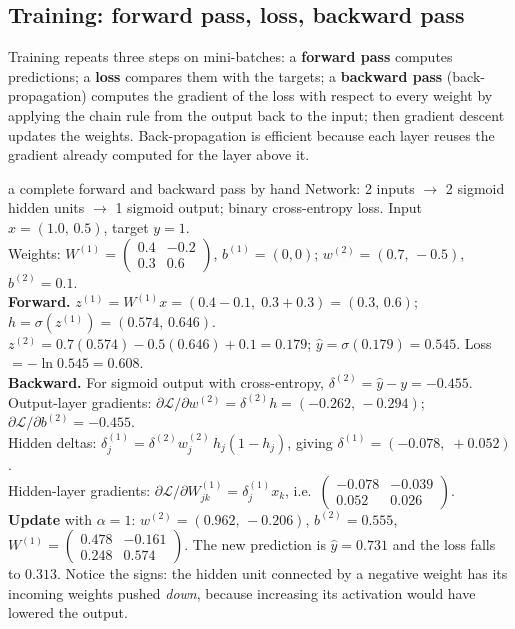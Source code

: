 \documentclass[11pt]{article}
\begin{document}
\subsection{Training: forward pass, loss, backward pass}
Training repeats three steps on mini-batches: a \textbf{forward pass} computes predictions; a \textbf{loss} compares them with the targets; a \textbf{backward pass} (back-propagation) computes the gradient of the loss with respect to every weight by applying the chain rule from the output back to the input; then gradient descent updates the weights. Back-propagation is efficient because each layer reuses the gradient already computed for the layer above it.
\begin{example}{a complete forward and backward pass by hand}
Network: 2 inputs $\to$ 2 sigmoid hidden units $\to$ 1 sigmoid output; binary cross-entropy loss. Input $x=(1.0,\,0.5)$, target $y=1$.\\
Weights: $W^{(1)}=\begin{pmatrix}0.4&-0.2\\0.3&0.6\end{pmatrix}$, $b^{(1)}=(0,0)$; $w^{(2)}=(0.7,\,-0.5)$, $b^{(2)}=0.1$.\\[3pt]
\textbf{Forward.} $z^{(1)}=W^{(1)}x=(0.4-0.1,\;0.3+0.3)=(0.3,\,0.6)$; $h=\sigma(z^{(1)})=(0.574,\,0.646)$.\\
$z^{(2)}=0.7(0.574)-0.5(0.646)+0.1=0.179$; $\hat y=\sigma(0.179)=0.545$. Loss $=-\ln0.545=0.608$.\\[3pt]
\textbf{Backward.} For sigmoid output with cross-entropy, $\delta^{(2)}=\hat y-y=-0.455$.\\
Output-layer gradients: $\partial\mathcal L/\partial w^{(2)}=\delta^{(2)}h=(-0.262,\,-0.294)$; $\partial\mathcal L/\partial b^{(2)}=-0.455$.\\
Hidden deltas: $\delta^{(1)}_j=\delta^{(2)}w^{(2)}_j\,h_j(1-h_j)$, giving $\delta^{(1)}=(-0.078,\;+0.052)$.\\
Hidden-layer gradients: $\partial\mathcal L/\partial W^{(1)}_{jk}=\delta^{(1)}_jx_k$, i.e.\ $\begin{pmatrix}-0.078&-0.039\\0.052&0.026\end{pmatrix}$.\\[3pt]
\textbf{Update} with $\alpha=1$: $w^{(2)}=(0.962,\,-0.206)$, $b^{(2)}=0.555$, $W^{(1)}=\begin{pmatrix}0.478&-0.161\\0.248&0.574\end{pmatrix}$. The new prediction is $\hat y=0.731$ and the loss falls to $0.313$. Notice the signs: the hidden unit connected by a negative weight has its incoming weights pushed \emph{down}, because increasing its activation would have lowered the output.
\end{example}
\end{document}
